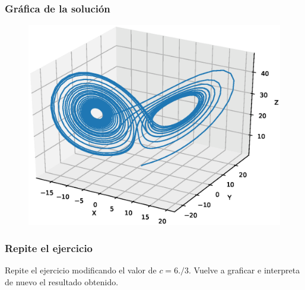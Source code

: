 \begin{frame}[plain]
\frametitle{Gráfica de la solución}
\begin{figure}
    \centering
    \includegraphics[scale=0.5]{Imagenes/ejercicio_odeint_06_sistema_lorenz.eps} 
\end{figure}
\end{frame}
\begin{frame}
\frametitle{Repite el ejercicio}
Repite el ejercicio modificando el valor de $c=6./3$. Vuelve a graficar e interpreta de nuevo el resultado obtenido.
\end{frame}


